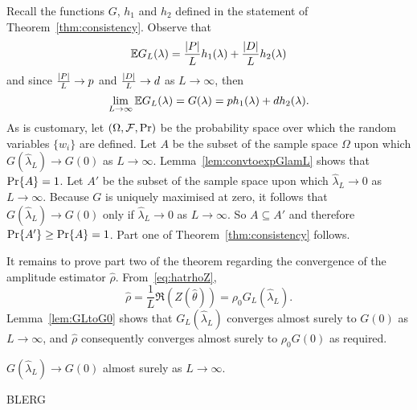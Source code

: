 \documentclass[journal]{IEEEtran}
\begin{document}
Recall the functions $G$, $h_1$ and $h_2$ defined in the statement of Theorem~\ref{thm:consistency}.  Observe that
\[
{\mathbb E} G_L(\lambda) = \frac{{\left\vert P \right\vert}}{L} h_1(\lambda) + \frac{{\left\vert D \right\vert}}{L} h_2(\lambda)
\]
and since $\frac{{\left\vert P \right\vert}}{L} \rightarrow p$ and $\frac{{\left\vert D \right\vert}}{L} \rightarrow d$ as $L \rightarrow \infty$, then
\[
\lim_{L \rightarrow\infty} {\mathbb E} G_L(\lambda) = G(\lambda) = p h_1(\lambda)   +  d h_2(\lambda).
\]
As is customary, let $(\Omega, \mathcal F, {\operatorname{Pr}})$ be the probability space over which the random variables $\{w_i\}$ are defined.  Let $A$ be the subset of the sample space $\Omega$ upon which $G(\hat{\lambda}_L) \rightarrow G(0)$ as $L\rightarrow\infty$.  Lemma~\ref{lem:convtoexpGlamL} shows that ${\operatorname{Pr}}\{A\} = 1$.  Let $A'$ be the subset of the sample space upon which $\hat{\lambda}_L \rightarrow 0$ as $L\rightarrow \infty$.  Because $G$ is uniquely maximised at zero, it follows that $G(\hat{\lambda}_L) \rightarrow G(0)$ only if $\hat{\lambda}_L \rightarrow 0$ as $L \rightarrow\infty$. So $A \subseteq A'$ and therefore ${\operatorname{Pr}}\{A'\} \geq {\operatorname{Pr}}\{A\} = 1$.  Part one of Theorem~\ref{thm:consistency} follows.  

It remains to prove part two of the theorem regarding the convergence of the amplitude estimator $\hat{\rho}$.  From~\eqref{eq:hatrhoZ},
\begin{equation}\label{eq:rhoGLZ}
\hat{\rho} = \frac{1}{L}\Re(Z(\hat{\theta})) = \rho_0 G_L(\hat{\lambda}_L).
\end{equation}  
Lemma~\ref{lem:GLtoG0} shows that $G_L(\hat{\lambda}_L)$ converges almost surely to $G(0)$ as $L\rightarrow\infty$, and $\hat{\rho}$ consequently converges almost surely to $\rho_0 G(0)$ as required.

\begin{lemma}\label{lem:convtoexpGlamL} 
$G(\hat{\lambda}_L) \rightarrow G(0)$ almost surely as $L \rightarrow \infty$.
\end{lemma}
\begin{IEEEproof}
BLERG
\end{IEEEproof}
\end{document}
